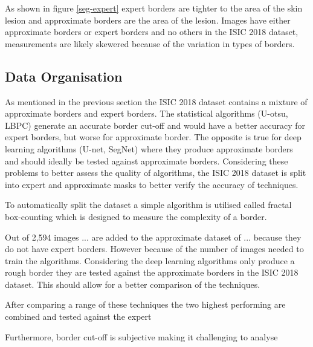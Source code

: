 As shown in figure \ref{seg-expert} expert borders are tighter to the area of the skin lesion and approximate borders are the area of the lesion. Images have either approximate borders or expert borders and no others in the ISIC 2018 dataset, measurements are likely skewered because of the variation in types of borders.

\subsection{Data Organisation}
As mentioned in the previous section the ISIC 2018 dataset contains a mixture of approximate borders and expert borders. The statistical algorithms (U-otsu, LBPC) generate an accurate border cut-off and would have a better accuracy for expert borders, but worse for approximate border. The opposite is true for deep learning algorithms (U-net, SegNet) where they produce approximate borders and should ideally be tested against approximate borders. Considering these problems to better assess the quality of algorithms, the ISIC 2018 dataset is split into expert and approximate masks to better verify the accuracy of techniques.

To automatically split the dataset a simple algorithm is utilised called fractal box-counting which is designed to measure the complexity of a border. 

Out of 2,594 images ... are added to the approximate dataset of ... because they do not have expert borders. However because of the number of images needed to train the algorithms. Considering the deep learning algorithms only produce a rough border they are tested against the approximate borders in the ISIC 2018 dataset. This should allow for a better comparison of the techniques.

After comparing a range of these techniques the two highest performing are combined and tested against the expert

Furthermore, border cut-off is subjective making it challenging to analyse


